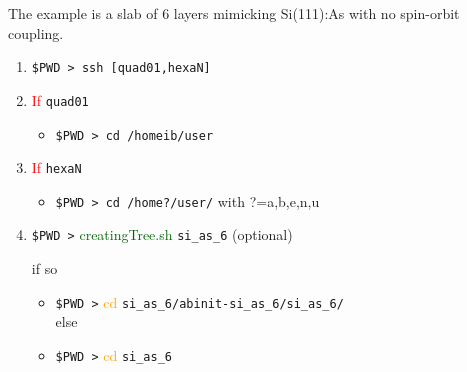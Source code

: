 \documentclass[12pt,leqno]{article}
\numberwithin{equation}{section}
\begin{document}
The example is a slab of 6 layers mimicking Si(111):As with no spin-orbit
coupling. 
\begin{enumerate}
\item \verb=$PWD > ssh [quad01,hexaN]= 

\item\textcolor{red}{If} \verb=quad01= 
\begin{itemize}
\item \verb=$PWD > cd /homeib/user= 
\end{itemize}
\item\textcolor{red}{If} \verb=hexaN=
\begin{itemize}
\item \verb=$PWD > cd /home?/user/=  with ?=a,b,e,n,u 
\end{itemize}
\item 
\verb=$PWD >= \textcolor{darkgreen}{creatingTree.sh} \verb=si_as_6=
(optional)\\ \strut\hspace{.9cm}if so 
\begin{itemize}
\item \verb=$PWD >= \textcolor{orange}{cd} \verb=si_as_6/abinit-si_as_6/si_as_6/=\\else
\item \verb=$PWD >= \textcolor{orange}{cd} \verb=si_as_6=
\end{itemize}


\end{enumerate}
\end{document}
